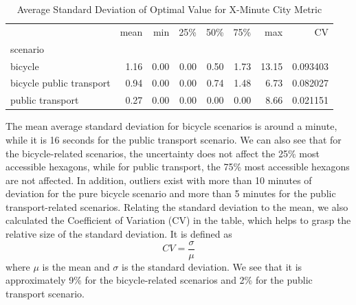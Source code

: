 \begin{table}
  \caption{Average Standard Deviation of Optimal Value for X-Minute City Metric}
  \label{tab:average_standard_deviation_of_optimal_value_for_x_minute_city_metric}
  \begin{center}
    \begin{tabular}{lrrrrrrr}
     & mean & min & 25\% & 50\% & 75\% & max & CV \\
    scenario &  &  &  &  &  &  &  \\
    bicycle & 1.16 & 0.00 & 0.00 & 0.50 & 1.73 & 13.15 & 0.093403 \\
    bicycle public transport & 0.94 & 0.00 & 0.00 & 0.74 & 1.48 & 6.73 & 0.082027 \\
    public transport & 0.27 & 0.00 & 0.00 & 0.00 & 0.00 & 8.66 & 0.021151 \\
    \end{tabular}
  \end{center}
\end{table}


The mean average standard deviation for bicycle scenarios is around a minute, while it is 16 seconds for the public transport scenario.
We can also see that for the bicycle-related scenarios, the uncertainty does not affect the 25\% most accessible hexagons, while for public transport, the 75\% most accessible hexagons are not affected.
In addition, outliers exist with more than 10 minutes of deviation for the pure bicycle scenario and more than 5 minutes for the public transport-related scenarios.
Relating the standard deviation to the mean, we also calculated the Coefficient of Variation (CV) in the table, which helps to grasp the relative size of the standard deviation.
It is defined as
$$ CV = \frac{\sigma}{\mu} $$
where $\mu$ is the mean and $\sigma$ is the standard deviation.
We see that it is approximately 9\% for the bicycle-related scenarios and 2\% for the public transport scenario.

